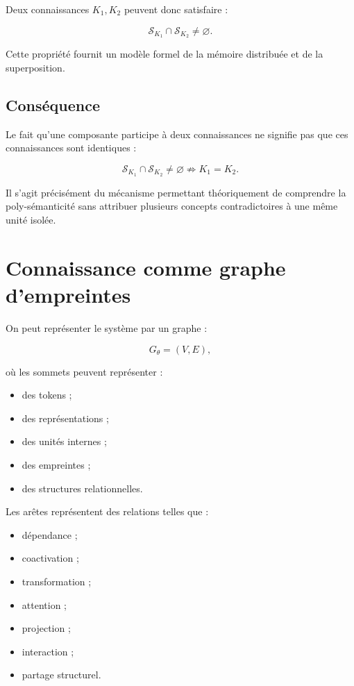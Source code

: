 \documentclass[11pt,a4paper]{article}
\begin{document}
Deux connaissances $K_1,K_2$ peuvent donc satisfaire :

\[
\mathcal S_{K_1}
\cap
\mathcal S_{K_2}
\neq
\varnothing.
\]

Cette propriété fournit un modèle formel de la mémoire distribuée et de la
superposition.

\subsection{Conséquence}

Le fait qu'une composante participe à deux connaissances ne signifie pas que
ces connaissances sont identiques :

\[
\boxed{
\mathcal S_{K_1}\cap\mathcal S_{K_2}\neq\varnothing
\not\Rightarrow
K_1=K_2.
}
\]

Il s'agit précisément du mécanisme permettant théoriquement de comprendre
la poly-sémanticité sans attribuer plusieurs concepts contradictoires à une
même unité isolée.

\section{Connaissance comme graphe d'empreintes}

On peut représenter le système par un graphe :

\[
G_\theta=(V,E),
\]

où les sommets peuvent représenter :

\begin{itemize}
    \item des tokens ;
    \item des représentations ;
    \item des unités internes ;
    \item des empreintes ;
    \item des structures relationnelles.
\end{itemize}

Les arêtes représentent des relations telles que :

\begin{itemize}
    \item dépendance ;
    \item coactivation ;
    \item transformation ;
    \item attention ;
    \item projection ;
    \item interaction ;
    \item partage structurel.
\end{itemize}
\end{document}
